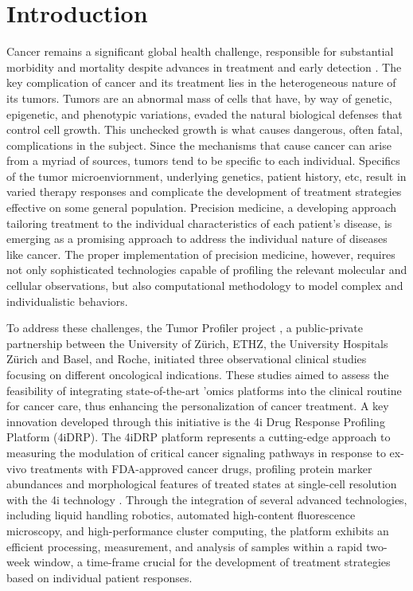 \section{Introduction}
Cancer remains a significant global health challenge, responsible for substantial morbidity and mortality despite advances in treatment and early detection \cite{miller2022}.
The key complication of cancer and its treatment lies in the heterogeneous nature of its tumors.
Tumors are an abnormal mass of cells that have, by way of genetic, epigenetic, and phenotypic variations, evaded the natural biological defenses that control cell growth.
This unchecked growth is what causes dangerous, often fatal, complications in the subject.
Since the mechanisms that cause cancer can arise from a myriad of sources, tumors tend to be specific to each individual.
Specifics of the tumor microenviornment, underlying genetics, patient history, etc,
result in varied therapy responses and complicate the development of treatment strategies effective on some general population.
Precision medicine, a developing approach tailoring treatment to the individual characteristics of each patient's disease,
is emerging as a promising approach to address the individual nature of diseases like cancer.
The proper implementation of precision medicine, however, requires not only sophisticated technologies capable of profiling the relevant molecular and cellular observations,
but also computational methodology to model complex and individualistic behaviors.

To address these challenges, the Tumor Profiler project \cite{irmisch2021}, a public-private partnership between the University of Zürich, ETHZ, the University Hospitals Zürich and Basel, and Roche, initiated three observational clinical studies focusing on different oncological indications.
These studies aimed to assess the feasibility of integrating state-of-the-art 'omics platforms into the clinical routine for cancer care, thus enhancing the personalization of cancer treatment.
A key innovation developed through this initiative is the 4i Drug Response Profiling Platform (4iDRP).
The 4iDRP platform represents a cutting-edge approach to measuring the modulation of critical cancer signaling pathways in response to ex-vivo treatments with FDA-approved cancer drugs,
profiling protein marker abundances and morphological features of treated states at single-cell resolution with the 4i technology \cite{gut2018}.
Through the integration of several advanced technologies, including liquid handling robotics, automated high-content fluorescence microscopy, and high-performance cluster computing,
the platform exhibits an efficient processing, measurement, and analysis of samples within a rapid two-week window,
a time-frame crucial for the development of treatment strategies based on individual patient responses.


